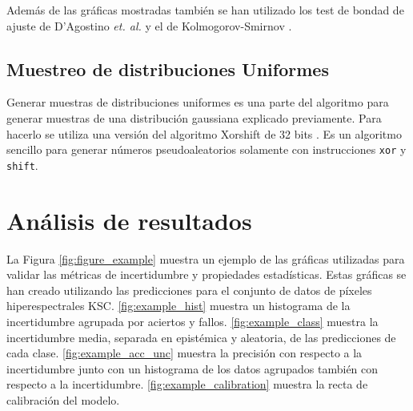 Además de las gráficas mostradas también se han utilizado los test de bondad de ajuste de D’Agostino \emph{et. al.} \cite{normaltest_1, normaltest_2} y el de Kolmogorov-Smirnov \cite{kstest}.

\subsection{Muestreo de distribuciones Uniformes}

Generar muestras de distribuciones uniformes es una parte del algoritmo para generar muestras de una distribución gaussiana explicado previamente. Para hacerlo se utiliza una versión del algoritmo Xorshift de 32 bits \cite{xorshift}. Es un algoritmo sencillo para generar números pseudoaleatorios solamente con instrucciones \texttt{xor} y \texttt{shift}.

\section{Análisis de resultados} \label{sec:uncertainty_example}

La Figura \ref{fig:figure_example} muestra un ejemplo de las gráficas utilizadas para validar las métricas de incertidumbre y propiedades estadísticas. Estas gráficas se han creado utilizando las predicciones para el conjunto de datos de píxeles hiperespectrales KSC. \ref{fig:example_hist} muestra un histograma de la incertidumbre agrupada por aciertos y fallos. \ref{fig:example_class} muestra la incertidumbre media, separada en epistémica y aleatoria, de las predicciones de cada clase. \ref{fig:example_acc_unc} muestra la precisión con respecto a la incertidumbre junto con un histograma de los datos agrupados también con respecto a la incertidumbre. \ref{fig:example_calibration} muestra la recta de calibración del modelo.

